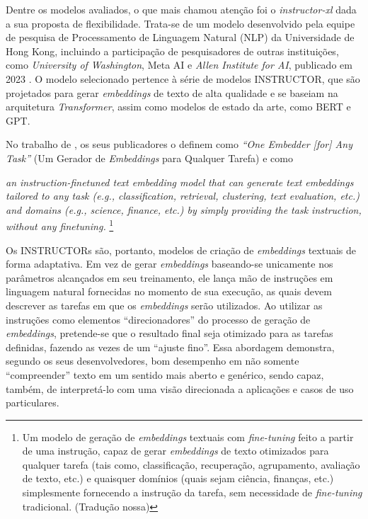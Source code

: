 Dentre os modelos avaliados, o que mais chamou atenção foi o \textit{instructor-xl} dada a sua proposta de flexibilidade. Trata-se de um modelo desenvolvido pela equipe de pesquisa de Processamento de Linguagem Natural (NLP) da Universidade de Hong Kong, incluindo a participação de pesquisadores de outras instituições, como \textit{University of Washington}, Meta AI e \textit{Allen Institute for AI}, publicado em 2023 \cite{Instructor:1}. O modelo selecionado pertence à série de modelos INSTRUCTOR, que são projetados para gerar \textit{embeddings} de texto de alta qualidade e se baseiam na arquitetura \textit{Transformer}, assim como modelos de estado da arte, como \ac{BERT} e \ac{GPT}.

No trabalho de  , os seus publicadores o definem como \textit{``One Embedder [for] Any Task''} (Um Gerador de \textit{Embeddings} para Qualquer Tarefa) e como

\begin{citacao}
    \textit{an instruction-finetuned text embedding model that can generate text embeddings tailored to any task (e.g., classification, retrieval, clustering, text evaluation, etc.) and domains (e.g., science, finance, etc.) by simply providing the task instruction, without any finetuning.} \footnote{Um modelo de geração de \textit{embeddings} textuais com \textit{fine-tuning} feito a partir de uma instrução, capaz de gerar \textit{embeddings} de texto otimizados para qualquer tarefa (tais como, classificação, recuperação, agrupamento, avaliação de texto, etc.) e quaisquer domínios (quais sejam ciência, finanças, etc.) simplesmente fornecendo a instrução da tarefa, sem necessidade de \textit{fine-tuning} tradicional. (Tradução nossa)}
\end{citacao}

Os INSTRUCTORs são, portanto, modelos de criação de \textit{embeddings} textuais de forma adaptativa. Em vez de gerar \textit{embeddings} baseando-se unicamente nos parâmetros alcançados em seu treinamento, ele lança mão de instruções em linguagem natural fornecidas no momento de sua execução, as quais devem descrever as tarefas em que os \textit{embeddings} serão utilizados. Ao utilizar as instruções como elementos ``direcionadores'' do processo de geração de \textit{embeddings}, pretende-se que o resultado final seja otimizado para as tarefas definidas, fazendo as vezes de um ``ajuste fino''. Essa abordagem demonstra, segundo os seus desenvolvedores, bom desempenho em não somente ``compreender'' texto em um sentido mais aberto e genérico, sendo capaz, também, de interpretá-lo com uma visão direcionada a aplicações e casos de uso particulares.

